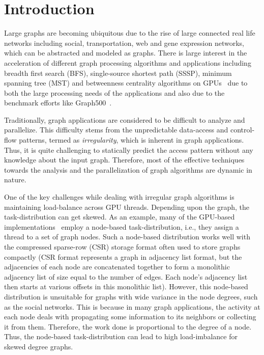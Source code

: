 \section{Introduction}
\label{intro}
Large graphs are becoming ubiquitous due to the rise of large connected real life networks including social, transportation, web and gene expression networks, which can be abstracted and modeled as graphs. There is large interest in the acceleration of different graph processing algorithms and applications including breadth first search (BFS), single-source shortest path (SSSP), minimum spanning tree (MST) and betweenness centrality algorithms on GPUs~\cite{nasre-morphgpus-ppopp2013, merrill-scalablegputraversal-ppopp2012, sariyuce-bc-gpgpu2013, gharaibeh-graphsgpus-ipdps2013, ediger-graphct-tpds2013, buluc-parallelBFS-sc2011,mclaughlin-bc-sc2014} due to both the large processing needs of the applications and also due to the benchmark efforts like Graph500~\cite{graph500-web}.

Traditionally, graph applications are considered to be difficult to analyze and parallelize. This difficulty stems from the unpredictable data-access and control-flow patterns, termed as \textit{irregularity}, which is inherent in graph applications. Thus, it is quite challenging to statically predict the access pattern without any knowledge about the input graph. Therefore, most of the effective techniques towards the analysis and the parallelization of graph algorithms are dynamic in nature.

One of the key challenges while dealing with irregular graph algorithms is maintaining load-balance across GPU threads. Depending upon the graph, the task-distribution can get skewed. As an example,
many of the GPU-based implementations~\cite{nasre-morphgpus-ppopp2013, nasre-datavstoplogy-ipdps2013, merrill-scalablegputraversal-ppopp2012, sariyuce-bc-gpgpu2013, gharaibeh-graphsgpus-ipdps2013} employ a node-based task-distribution, i.e., they assign a thread to a set of graph nodes. 
Such a node-based distribution works well with the compressed sparse-row (CSR) storage format often used to store graphs compactly
(CSR format represents a graph in adjacency list format, but the adjacencies of each node are concatenated together to form a monolithic adjacency list 
of size equal to the number of edges. 
Each node's adjacency list then starts at various offsets in this monolithic list).
However, this node-based distribution is unsuitable for graphs with wide variance in the node degrees, such as the social networks. 
This is because in many graph applications, the activity at each node deals with propagating some information to its neighbors or collecting it from them.
Therefore, the work done is proportional to the degree of a node.
Thus, the node-based task-distribution can lead to high load-imbalance for skewed degree graphs. 

